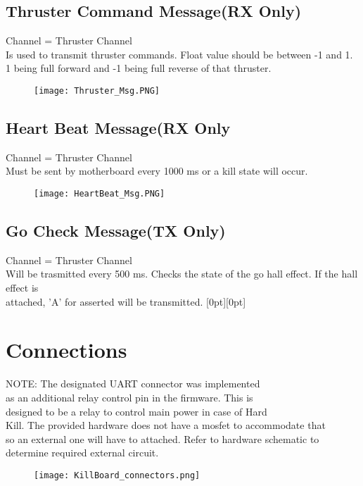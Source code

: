 \documentclass[a4paper,12pt,oneside,pdflatex,italian,final,twocolumn]{article}
\begin{document}
\raggedright
\subsection{Thruster Command Message(RX Only)}
\raggedright
Channel = Thruster Channel\\ 
Is used to transmit thruster commands.
Float value should be between -1 and 1. 1 being full forward and -1 being full reverse of that thruster.
\begin{figure}[h]
\centering
\texttt{[image: Thruster\_Msg.PNG]}
\end{figure}

\raggedright
\subsection{Heart Beat Message(RX Only}
\raggedright
Channel = Thruster Channel\\ 
Must be sent by motherboard every 1000 ms or a kill state will occur.
\begin{figure}[h]
\centering
\texttt{[image: HeartBeat\_Msg.PNG]}
\end{figure}

\raggedright
\subsection{Go Check Message(TX Only)}
\raggedright
Channel = Thruster Channel\\ 
Will be trasmitted every 500 ms. Checks the state of the go hall effect. If the hall effect is\\ attached, 'A' for asserted will 
be transmitted.
\raisebox{-4cm}[0pt][0pt]{
\centering
{}
}

\vspace{3cm}

\pagebreak
\raggedright
\section{Connections}

    NOTE: The designated UART connector was implemented\\
    as an additional relay control pin in the firmware. This is \\
    designed to be a relay to control main power in case of Hard\\
    Kill. The provided hardware does not have a mosfet to accommodate that\\
    so an external one will have to attached. Refer to hardware schematic to\\ 
    determine required external circuit. 


\begin{figure}[h]
\centering
\texttt{[image: KillBoard\_connectors.png]}
\end{figure}
\end{document}
